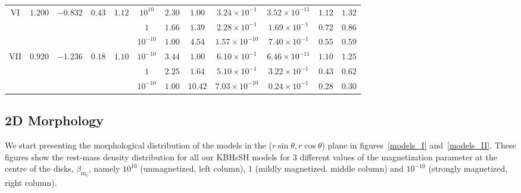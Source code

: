 \documentclass[twocolumn,aps,showpacs,showkeys,prd,superscriptaddress,byrevtex, amsmath]{revtex4-1}
\begin{document}
\begin{table}[t]
\begin{tabular}{c c c c c  c c c c c c c}
VI & $1.200$ & $-0.832$ & $0.43$ & $1.12$ & $10^{10}$ & $2.30$ & $1.00$ & $3.24 \times 10^{-1}$ & $3.52 \times 10^{-11}$ & $1.12$ & $1.32$ \\ 

 &  &  &  &  & $1$ & $1.66$ & $1.39$ & $2.28 \times 10^{-1}$ & $1.69\times 10^{-1}$ & $0.72$ & $0.86$ \\ 

 &  &  &  &  & $10^{-10}$ & $1.00$ & $4.54$ & $1.57 \times 10^{-10}$ & $7.40\times 10^{-1}$ & $0.55$ & $0.59$ \\ 
 
VII & $0.920$ & $-1.236$ & $0.18$ & $1.10$ & $10^{-10}$ & $3.44$ & $1.00$ & $6.10 \times 10^{-1}$ & $6.46 \times 10^{-11}$ & $1.10$ & $1.25$ \\ 

 &  &  &  &  & $1$ & $2.25$ & $1.64$ & $5.10 \times 10^{-1}$ & $3.22\times 10^{-1}$ & $0.43$ & $0.62$\\ 

 &  &  &  &  & $10^{-10}$ & $1.00$ & $10.42$ & $7.03 \times 10^{-10}$ & $0.24 \times 10^{-1}$ & $0.28$ & $0.30$\\ 
\hline\hline
\end{tabular}
\end{table}

\subsection{2D Morphology}

We start presenting the morphological distribution of the models in the ($r\sin\theta, r\cos\theta$) plane in figures~\ref{models_I} and~\ref{models_II}. These figures show the rest-mass density distribution for all our KBHsSH models for 3 different values of the magnetization parameter at the centre of the disks, $\beta_{\mathrm{m_c}}$, namely $10^{10}$ (unmagnetized, left column), $1$ (mildly magnetized, middle column) and $10^{-10}$ (strongly magnetized, right column). 
\end{document}
